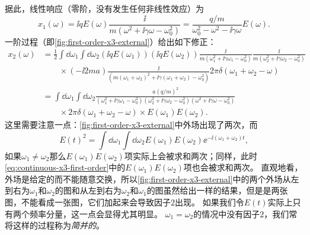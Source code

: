 据此，线性响应（零阶，没有发生任何非线性效应）为
\begin{equation}
    x_1(\omega) = \ii q E(\omega) \frac{\ii}{m (\omega^2 + \ii \gamma \omega - \omega_0^2)} = \frac{q / m}{\omega_0^2 - \omega^2 - \ii \gamma \omega} E(\omega).
\end{equation}
一阶过程（即\autoref{fig:first-order-x3-external}）给出如下修正：
\begin{equation}
    \begin{aligned}
        x_2(\omega) &= \frac{1}{2} \int \dd{\omega_1} \int \dd{\omega_2} (\ii q E(\omega_1)) (\ii q E(\omega_2)) \frac{\ii}{m(\omega_1^2 + \ii \gamma \omega_1 - \omega_0^2)} \frac{\ii}{m(\omega_2^2 + \ii \gamma \omega_2 - \omega_0^2)} \\ 
        &\quad \quad \times (-\ii 2 m a) \frac{\ii}{(m(\omega_1 + \omega_2)^2 + \ii \gamma (\omega_1 + \omega_2) - \omega_0^2)} 2\pi \delta(\omega_1 + \omega_2 - \omega) \\
        &= \int \dd{\omega_1} \int \dd{\omega_2} \frac{a (q / m)^2}{(\omega_1^2 + \ii \gamma \omega_1 - \omega_0^2) (\omega_2^2 + \ii \gamma \omega_2 - \omega_0^2) (\omega^2 + \ii \gamma \omega - \omega_0^2)}  \\
        &\quad \quad \times 2\pi \delta(\omega_1 + \omega_2 - \omega) \times E(\omega_1) E(\omega_2).
    \end{aligned} 
    \label{eq:continuous-x3-first-order}
\end{equation}
这里需要注意一点：\autoref{fig:first-order-x3-external}中外场出现了两次，而
\[
    E(t)^2 = \int \dd{\omega_1} \int \dd{\omega_2} E(\omega_1) E(\omega_2) \ee^{-\ii (\omega_1 + \omega_2) t},
\]
如果$\omega_1 \neq \omega_2$那么$E(\omega_1) E(\omega_2)$项实际上会被求和两次；同样，此时\eqref{eq:continuous-x3-first-order}中的$E(\omega_1) E(\omega_2)$项也会被求和两次。
直观地看，外场是给定的而不能随意交换，所以\autoref{fig:first-order-x3-external}中的两个外场从左到右为$\omega_1$和$\omega_2$的图和从左到右为$\omega_2$和$\omega_1$的图虽然给出一样的结果，但是是两张图，不能看成一张图，它们加起来会导致因子$2$出现。
如果我们令$E(t)$实际上只有两个频率分量，这一点会显得尤其明显。
$\omega_1 = \omega_2$的情况中没有因子$2$，我们常将这样的过程称为\emph{简并的}。

